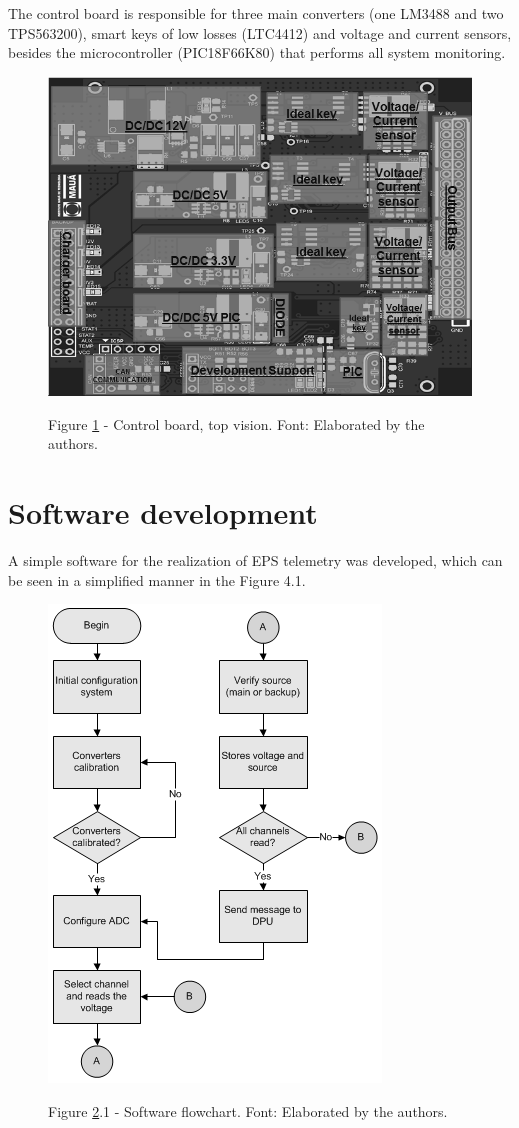 \documentclass[3p]{elsarticle}
\begin{document}
	The control board is responsible for three main converters (one LM3488 and two TPS563200), smart keys of low losses (LTC4412) and voltage and current sensors, besides the microcontroller (PIC18F66K80)  that performs all system monitoring.\cite{3488}\cite{563200}\cite{4412}\cite{18f}
	
	\begin{figure}[th]
		\label{control}
		\centering
		\includegraphics[width=0.4\linewidth]{./figs/control}
			
		\begin{small}
		Figure \ref{control} - Control board, top vision. Font: Elaborated by the authors.
		\end{small}		
	\end{figure}

\section{Software development}
\label{Software development}

	A simple software for the realization of EPS telemetry was developed, which can be seen in a simplified manner in the Figure 4.1.
	
	\begin{figure}[th]
		\label{flow}
		\centering
		\includegraphics[width=0.3\linewidth]{./figs/fluxo}
			
		\begin{small}
		Figure \ref{flow}.1 - Software flowchart. Font: Elaborated by the authors.
		\end{small}		
	\end{figure}
\end{document}
